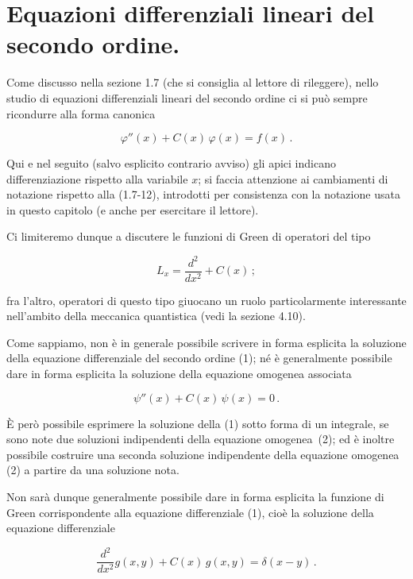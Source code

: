 \documentclass[11pt, a4paper]{book}
\numberwithin{equation}{section}
\begin{document}
\section{Equazioni differenziali lineari del secondo ordine.}

Come discusso nella sezione 1.7 (che si consiglia al lettore di rileggere), nello studio di equazioni differenziali lineari del secondo ordine ci si può sempre ricondurre alla forma canonica

\begin{equation}
    \varphi''(x) + C(x)\,\varphi(x) = f(x) \,.
\end{equation}

Qui e nel seguito (salvo esplicito contrario avviso) gli apici indicano differenziazione rispetto alla variabile $x$; si faccia attenzione ai cambiamenti di notazione rispetto alla (1.7-12), introdotti per consistenza con la notazione usata in questo capitolo (e anche per esercitare il lettore).

Ci limiteremo dunque a discutere le funzioni di Green di operatori del tipo

\begin{equation}
    L_x = \frac{d^2}{dx^2} + C(x) \,;
\end{equation}

fra l'altro, operatori di questo tipo giuocano un ruolo particolarmente interessante nell'ambito della meccanica quantistica (vedi la sezione 4.10).

Come sappiamo, non è in generale possibile scrivere in forma esplicita la soluzione della equazione differenziale del secondo ordine (1); né è generalmente possibile dare in forma esplicita la soluzione della equazione omogenea associata

\begin{equation}
    \psi''(x) + C(x)\,\psi(x) = 0 \,.
\end{equation}

È però possibile esprimere la soluzione della (1) sotto forma di un integrale, se sono note due soluzioni indipendenti della equazione omogenea~(2); ed è inoltre possibile costruire una seconda soluzione indipendente della equazione omogenea (2) a partire da una soluzione nota.

Non sarà dunque generalmente possibile dare in forma esplicita la funzione di Green corrispondente alla equazione differenziale (1), cioè la soluzione della equazione differenziale

\begin{equation}
    \frac{d^2}{dx^2} g(x,y) + C(x)\,g(x,y) = \delta(x-y) \,.
\end{equation}
\end{document}
